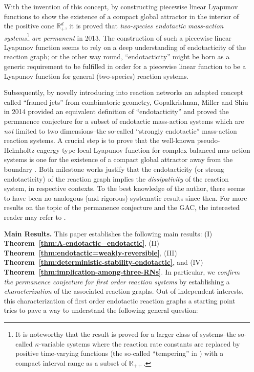 \documentclass[10pt]{amsart}
\numberwithin{equation}{section}
\theoremstyle{plain}
\theoremstyle{definition}
\theoremstyle{remark}
\begin{document}
{With the invention of this concept, by constructing piecewise linear Lyapunov functions to show the existence of a compact global attractor in the interior of the positive cone $\mathbb{R}^d_+$, it is proved that \emph{two-species endotactic mass-action  systems}\footnote{It is noteworthy that the result is proved for a larger class of systems\---the so-called $\kappa$-variable systems where the reaction rate constants are replaced by positive time-varying functions (the so-called ``tempering'' in \cite{GMS14}) with a compact interval range as a subset of $\mathbb{R}_{++}$.}  \emph{are permanent} \cite{CNP13} in 2013. 
The construction of such a  piecewise linear Lyapunov function seems to rely on a deep understanding of endotacticity of the reaction graph; or the other way round, ``endotacticity'' might be born as a generic requirement to be fulfilled in order for a piecewise linear function to be a Lyapunov function for general (two-species) reaction systems.  

Subsequently, by novelly introducing into reaction networks an adapted concept called ``framed jets'' \cite{MP08} from combinatoric geometry, Gopalkrishnan, Miller and Shiu \cite{GMS14} in 2014 provided an equivalent definition of ``endotacticity'' \cite[Lemma~6.22]{GMS14} and proved the permanence conjecture for a subset of endotactic mass-action systems which are \emph{not} limited to two dimensions\---the so-called ``strongly endotactic'' mass-action reaction systems. A crucial step is to prove that the well-known pseudo-Helmholtz engergy type local Lyapunov function for complex-balanced mas-action systems is one for the existence of a compact global attractor away from the boundary \cite[Theorem~7.5]{GMS14}. Both milestone works \cite{CNP13,GMS14} justify that the endotacticity (or strong endotacticity) of the reaction graph implies the  \emph{dissipativity} of the reaction system, in respective contexts. To the best knowledge of the author, there seems to have been no analogous (and rigorous) systematic results since then. For more results on the topic of the permanence conjecture and the GAC, the interested reader may refer to \cite{H74,DAS07,A08,G09,CDSS09,AS10,SJ11,A11a,A11a,P12,CNP13,GMS14,F19}.} 
\smallskip

\noindent\textbf{Main Results.} This paper establishes the following main results: (I) \textbf{Theorem~\ref{thm:A-endotactic=endotactic}}, (II) \textbf{Theorem~\ref{thm:endotactic=weakly-reversible}},  (III) \textbf{Theorem~\ref{thm:deterministic-stability-endotactic}}, and (IV) \textbf{Theorem~\ref{thm:implication-among-three-RNs}}. In particular, we \emph{confirm the permanence conjecture for first order reaction systems} by establishing a \emph{characterization} of the associated reaction graphs.  Out of independent interests, this  characterization of first order endotactic reaction graphs a starting point tries to pave a way to understand the following general question: 
\smallskip
\end{document}
